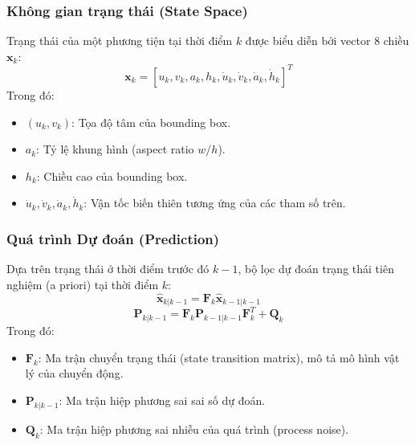 \subsubsection{Không gian trạng thái (State Space)}
Trạng thái của một phương tiện tại thời điểm $k$ được biểu diễn bởi vector 8 chiều $\mathbf{x}_k$:
\begin{equation}
    \mathbf{x}_k = [u_k, v_k, a_k, h_k, \dot{u}_k, \dot{v}_k, \dot{a}_k, \dot{h}_k]^T
\end{equation}
Trong đó:
\begin{itemize}
    \item $(u_k, v_k)$: Tọa độ tâm của bounding box.
    \item $a_k$: Tỷ lệ khung hình (aspect ratio $w/h$).
    \item $h_k$: Chiều cao của bounding box.
    \item $\dot{u}_k, \dot{v}_k, \dot{a}_k, \dot{h}_k$: Vận tốc biến thiên tương ứng của các tham số trên.
\end{itemize}

\subsubsection{Quá trình Dự đoán (Prediction)}
Dựa trên trạng thái ở thời điểm trước đó $k-1$, bộ lọc dự đoán trạng thái tiên nghiệm (a priori) tại thời điểm $k$:
\begin{equation}
    \hat{\mathbf{x}}_{k|k-1} = \mathbf{F}_k \hat{\mathbf{x}}_{k-1|k-1}
\end{equation}
\begin{equation}
    \mathbf{P}_{k|k-1} = \mathbf{F}_k \mathbf{P}_{k-1|k-1} \mathbf{F}_k^T + \mathbf{Q}_k
\end{equation}
Trong đó:
\begin{itemize}
    \item $\mathbf{F}_k$: Ma trận chuyển trạng thái (state transition matrix), mô tả mô hình vật lý của chuyển động.
    \item $\mathbf{P}_{k|k-1}$: Ma trận hiệp phương sai sai số dự đoán.
    \item $\mathbf{Q}_k$: Ma trận hiệp phương sai nhiễu của quá trình (process noise).
\end{itemize}

